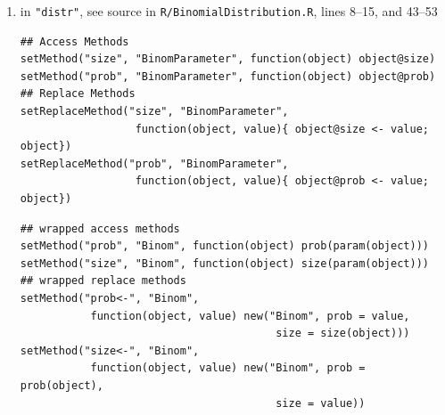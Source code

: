 \documentclass[10pt]{article}
\def\file#1{{\tt #1}}
\def\pkg#1{{\tt "#1"}}
\begin{document}
\begin{enumerate}
\item in \pkg{distr}, see source in \file{R/BinomialDistribution.R},  
%
lines 8--15, and
43--53
\Rlstset
\begin{lstlisting}
## Access Methods
setMethod("size", "BinomParameter", function(object) object@size)
setMethod("prob", "BinomParameter", function(object) object@prob)
## Replace Methods
setReplaceMethod("size", "BinomParameter", 
                  function(object, value){ object@size <- value; object})
setReplaceMethod("prob", "BinomParameter", 
                  function(object, value){ object@prob <- value; object})
\end{lstlisting}
%

\Rlstset
\begin{lstlisting}
## wrapped access methods
setMethod("prob", "Binom", function(object) prob(param(object)))
setMethod("size", "Binom", function(object) size(param(object)))
## wrapped replace methods
setMethod("prob<-", "Binom", 
           function(object, value) new("Binom", prob = value, 
                                        size = size(object)))
setMethod("size<-", "Binom", 
           function(object, value) new("Binom", prob = prob(object), 
                                        size = value))


\end{lstlisting}
\end{enumerate}
\end{document}
